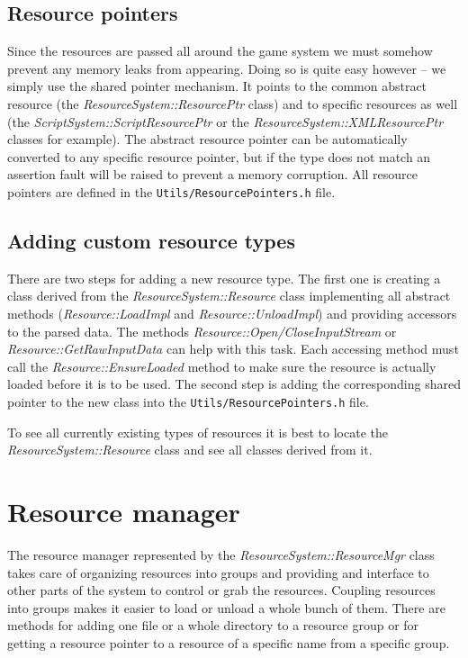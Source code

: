 \subsection{Resource pointers}

Since the resources are passed all around the game system we must somehow prevent any memory leaks from appearing. Doing so is quite easy however -- we simply use the shared pointer mechanism. It points to the common abstract resource (the \emph{ResourceSystem::ResourcePtr} class) and to specific resources as well (the \emph{ScriptSystem::ScriptResourcePtr} or the \emph{ResourceSystem::XMLResourcePtr} classes for example). The abstract resource pointer can be automatically converted to any specific resource pointer, but if the type does not match an assertion fault will be raised to prevent a memory corruption. All resource pointers are defined in the \verb'Utils/ResourcePointers.h' file.

\subsection{Adding custom resource types}
\label{sub:resource-adding}

There are two steps for adding a new resource type. The first one is creating a class derived from the \emph{ResourceSystem::Resource} class implementing all abstract methods (\emph{Resource::LoadImpl} and \emph{Resource::UnloadImpl}) and providing accessors to the parsed data. The methods \emph{Resource::Open/Close\-Input\-Stream} or \emph{Resource::GetRawInputData} can help with this task. Each accessing method must call the \emph{Resource::EnsureLoaded} method to make sure the resource is actually loaded before it is to be used. The second step is adding the corresponding shared pointer to the new class into the \verb'Utils/ResourcePointers.h' file.

To see all currently existing types of resources it is best to locate the \emph{ResourceSystem::Resource} class and see all classes derived from it.

\section{Resource manager}

The resource manager represented by the \emph{ResourceSystem::ResourceMgr} class takes care of organizing resources into groups and providing and interface to other parts of the system to control or grab the resources. Coupling resources into groups makes it easier to load or unload a whole bunch of them. There are methods for adding one file or a whole directory to a resource group or for getting a resource pointer to a resource of a specific name from a specific group.

